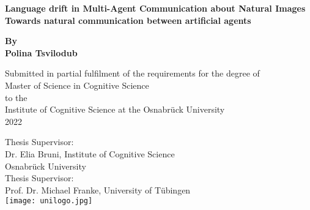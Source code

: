 \begin{titlepage}
	\begin{center}
		\vspace*{1cm}
		\Huge
		\textbf{Language drift in Multi-Agent Communication about Natural Images\\} 
		\vspace{0.5cm}
		\Large
		\textbf{Towards natural communication between artificial agents}
		
		\vspace{1cm}
		
	
		\textbf{By \\ Polina Tsvilodub}
		
		\vspace{1cm}
		\small
		Submitted in partial fulfilment of the requirements for the degree of \\
		Master of Science in Cognitive Science \\ to the \\
		Institute of Cognitive Science at the Osnabrück University\\
		2022
		
		\vspace{2cm}
		Thesis Supervisor:\\ Dr. Elia Bruni, Institute of Cognitive Science \\Osnabr\"uck University\\
		\vspace{0.5cm}
		Thesis Supervisor:\\ Prof. Dr. Michael Franke, University of T\"ubingen \\  
		\vfill 
		\texttt{[image: unilogo.jpg]}
		
	\end{center}
\end{titlepage}